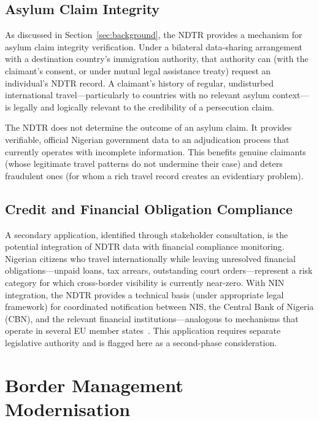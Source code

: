 \documentclass[11pt]{article}
\begin{document}
\subsection{Asylum Claim Integrity}

As discussed in Section~\ref{sec:background}, the NDTR provides
a mechanism for asylum claim integrity verification.
Under a bilateral data-sharing arrangement with a destination country's
immigration authority, that authority can (with the claimant's consent,
or under mutual legal assistance treaty) request an individual's NDTR
record. A claimant's history of regular, undisturbed international
travel---particularly to countries with no relevant asylum context---is
legally and logically relevant to the credibility of a persecution claim.

The NDTR does not determine the outcome of an asylum claim.
It provides verifiable, official Nigerian government data to
an adjudication process that currently operates with incomplete
information. This benefits genuine claimants (whose legitimate
travel patterns do not undermine their case) and deters fraudulent
ones (for whom a rich travel record creates an evidentiary problem).

\subsection{Credit and Financial Obligation Compliance}

A secondary application, identified through stakeholder consultation,
is the potential integration of NDTR data with financial compliance
monitoring. Nigerian citizens who travel internationally while
leaving unresolved financial obligations---unpaid loans, tax
arrears, outstanding court orders---represent a risk category
for which cross-border visibility is currently near-zero.
With NIN integration, the NDTR provides a technical basis (under
appropriate legal framework) for coordinated notification between
NIS, the Central Bank of Nigeria (CBN), and the relevant financial
institutions---analogous to mechanisms that operate in several
EU member states~\cite{cbn2023}. This application requires
separate legislative authority and is flagged here as a
second-phase consideration.

\section{Border Management Modernisation}
\label{sec:border}
\end{document}
